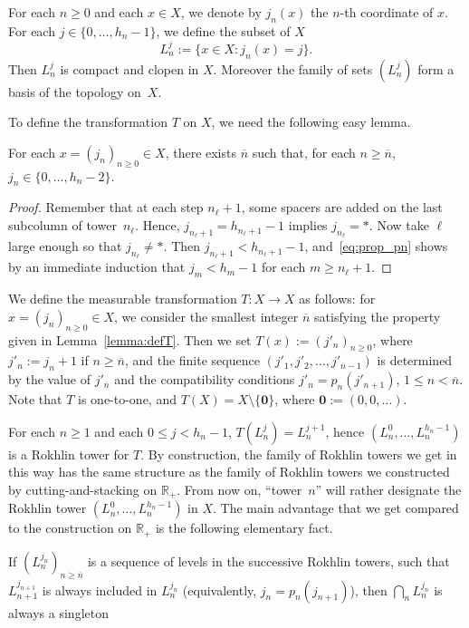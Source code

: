 \documentclass[AHL,Unicode,longabstracts]{cedram}
\newcommand{\egdef}{:=}
\newcommand{\RR}{\mathbb{R}}
\newcommand{\bz}{\boldsymbol{0}}
\begin{document}
For each $n\ge0$ and each $x\in X$, we denote by $j_n(x)$ the $n$-th coordinate of $x$. For each $j\in\{0,\ldots,h_n-1\}$, we define the subset of $X$
\[
L_n^j\egdef\{x\in X: j_n(x)=j\}.
\]
Then $L_n^j$ is compact and clopen in $X$. Moreover the family of sets $(L_n^j)$ form a basis of the topology on~$X$.

To define the transformation $T$ on $X$, we need the following easy lemma.

\begin{lemm}\label{lemma:defT}
For each $x=(j_n)_{n\ge0}\in X$, there exists $\overline{n}$ such that, for each $n\ge \overline{n}$, $j_n \in \{0,\ldots,h_n-2\}$.
\end{lemm}

\begin{proof}
Remember that at each step $n_{\ell}+1$, some spacers are added on the last subcolumn of tower~$n_\ell$. Hence, $j_{n_\ell+1}=h_{n_\ell+1}-1$ implies $j_{n_\ell}= \ast$. Now take $\ell$ large enough so that $j_{n_\ell}\neq \ast$. Then $j_{n_\ell+1}<h_{n_\ell+1}-1$, and~\eqref{eq:prop_pn} shows by an immediate induction that $j_m < h_m-1$ for each $m\ge n_\ell+1$.
\end{proof}

We define the measurable transformation $T:X\to X$ as follows: for $x=(j_n)_{n\ge0}\in X$, we consider the smallest integer $\overline{n}$ satisfying the property given in Lemma~\ref{lemma:defT}. Then we set $T(x)\egdef (j'_n)_{n\ge0}$, where $j'_n\egdef j_n+1$ if $n\ge\overline{n}$, and the finite sequence $(j'_1,j'_2,\ldots,j'_{\overline{n}-1})$ is determined by the value of $j'_{\overline{n}}$ and the compatibility conditions $j'_n=p_n(j'_{n+1})$, $1\le n<\overline{n}$. Note that $T$ is one-to-one, and $T(X)=X\setminus\{\bz\}$, where $\bz\egdef(0,0,\ldots)$.

For each $n\ge1$ and each $0\le j<h_n-1$, $T(L_n^j)=L_n^{j+1}$, hence $(L_n^0,\ldots,L_n^{h_n-1})$ is a Rokhlin tower for $T$. By construction, the family of Rokhlin towers we get in this way has the same structure as the family of Rokhlin towers we constructed by cutting-and-stacking on $\RR_+$. From now on, ``tower~$n$'' will rather designate the Rokhlin tower $(L_n^0,\ldots,L_n^{h_n-1})$ in $X$. The main advantage that we get compared to the construction on $\RR_+$ is the following elementary fact.

\begin{rema}\label{rem:nonemptyintersection}
If $\left(L_n^{j_n}\right)_{n\ge \overline{n}}$ is a sequence of levels in the successive Rokhlin towers, such that $L_{n+1}^{j_{n+1}}$ is always included in $L_n^{j_n}$ (equivalently, $j_n=p_n(j_{n+1})$), then $\bigcap_n L_n^{j_n}$ is always a singleton
\end{rema}
\end{document}
